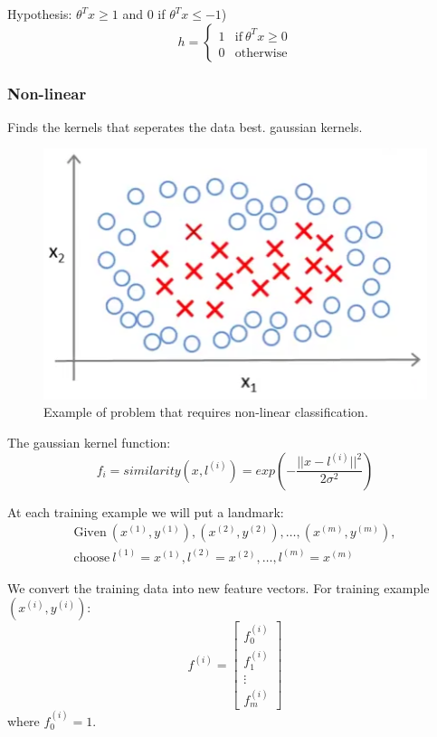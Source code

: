 Hypothesis:  $\theta^Tx \geq 1$ and 0 if $\theta^Tx \leq -1$)
\begin{equation}
h = 
\begin{cases}
1 & \text{if}\ \theta^Tx \geq 0 \\
0 & \text{otherwise}
\end{cases}
\end{equation}


\subsubsection{Non-linear}
Finds the kernels that seperates the data best.
gaussian kernels.

\begin{figure}[H]
\centering
\includegraphics[scale=.75]{billeder/svm-non-linear}
\caption{Example of problem that requires non-linear classification.}
\label{fig:svm-non-linear}
\end{figure}

The gaussian kernel function:
\begin{equation}
f_i = similarity(x,l^{(i)}) =
exp\left(-\frac{||x-l^{(i)}||^2}{2\sigma^2}\right)
\end{equation}

At each training example we will put a landmark:
\begin{equation}
\begin{split}
\text{Given}\ (x^{(1)},y^{(1)}),(x^{(2)},y^{(2)}),\dots,(x^{(m)},y^{(m)}),\\
\text{choose}\ l^{(1)} = x^{(1)},l^{(2)} = x^{(2)},\dots,l^{(m)} = x^{(m)}
\end{split}
\end{equation}

We convert the training data into new feature vectors. For training example $(x^{(i)},y^{(i)})$:
\begin{equation}
f^{(i)}=
\begin{bmatrix}
f_0^{(i)} \\
f_1^{(i)} \\
\vdots \\
f_m^{(i)}
\end{bmatrix}
\end{equation}
 where $f_0^{(i)} = 1$.

